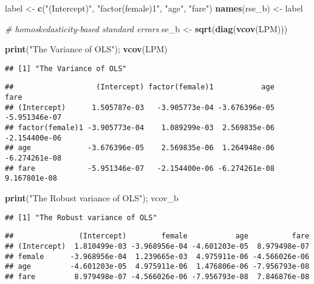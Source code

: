 \documentclass[
  12pt,
]{article}
\newenvironment{Shaded}{\begin{snugshade}}{\end{snugshade}}
\newcommand{\CommentTok}[1]{\textcolor[rgb]{0.56,0.35,0.01}{\textit{#1}}}
\newcommand{\KeywordTok}[1]{\textcolor[rgb]{0.13,0.29,0.53}{\textbf{#1}}}
\newcommand{\NormalTok}[1]{#1}
\newcommand{\StringTok}[1]{\textcolor[rgb]{0.31,0.60,0.02}{#1}}
\begin{document}
\begin{Shaded}
\begin{Highlighting}[]
\NormalTok{label \textless{}{-}}\StringTok{ }\KeywordTok{c}\NormalTok{(}\StringTok{"(Intercept)"}\NormalTok{, }\StringTok{"factor(female)1"}\NormalTok{, }\StringTok{"age"}\NormalTok{, }\StringTok{"fare"}\NormalTok{)}
\KeywordTok{names}\NormalTok{(rse\_b) \textless{}{-}}\StringTok{ }\NormalTok{label}

\CommentTok{\# homoskedasticity{-}based standard errors}
\NormalTok{se\_b \textless{}{-}}\StringTok{ }\KeywordTok{sqrt}\NormalTok{(}\KeywordTok{diag}\NormalTok{(}\KeywordTok{vcov}\NormalTok{(LPM)))}

\KeywordTok{print}\NormalTok{(}\StringTok{"The Variance of OLS"}\NormalTok{); }\KeywordTok{vcov}\NormalTok{(LPM)}
\end{Highlighting}
\end{Shaded}

\begin{verbatim}
## [1] "The Variance of OLS"
\end{verbatim}

\begin{verbatim}
##                   (Intercept) factor(female)1           age          fare
## (Intercept)      1.505787e-03   -3.905773e-04 -3.676396e-05 -5.951346e-07
## factor(female)1 -3.905773e-04    1.089299e-03  2.569835e-06 -2.154400e-06
## age             -3.676396e-05    2.569835e-06  1.264948e-06 -6.274261e-08
## fare            -5.951346e-07   -2.154400e-06 -6.274261e-08  9.167801e-08
\end{verbatim}

\begin{Shaded}
\begin{Highlighting}[]
\KeywordTok{print}\NormalTok{(}\StringTok{"The Robust variance of OLS"}\NormalTok{); vcov\_b}
\end{Highlighting}
\end{Shaded}

\begin{verbatim}
## [1] "The Robust variance of OLS"
\end{verbatim}

\begin{verbatim}
##               (Intercept)        female           age          fare
## (Intercept)  1.810499e-03 -3.968956e-04 -4.601203e-05  8.979498e-07
## female      -3.968956e-04  1.239665e-03  4.975911e-06 -4.566026e-06
## age         -4.601203e-05  4.975911e-06  1.476806e-06 -7.956793e-08
## fare         8.979498e-07 -4.566026e-06 -7.956793e-08  7.846876e-08
\end{verbatim}
\end{document}
